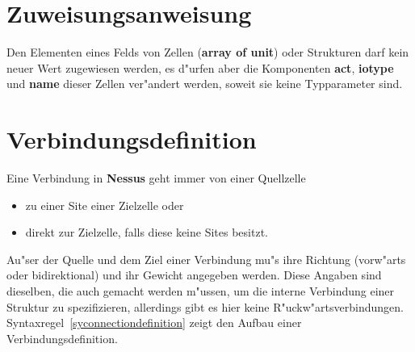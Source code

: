 \section{Zuweisungsanweisung}
\label{assignmentstatement}

\begin{center}
\end{center}

Den Elementen eines Felds von Zellen ({\bf array of unit})
oder Strukturen darf kein neuer Wert zugewiesen werden, es d"urfen
aber die Komponenten {\bf act}, {\bf iotype} und {\bf name} dieser
Zellen ver"andert werden, soweit sie keine Typparameter sind.



\section{Verbindungsdefinition}
\label{Verbindungsdefinition}

Eine Verbindung in {\bf
Nessus} geht immer von einer Quellzelle

\begin{itemize}
  \item zu einer Site einer Zielzelle oder
  \item direkt zur Zielzelle, falls diese keine Sites besitzt.
\end{itemize}

Au"ser der Quelle und dem Ziel einer Verbindung 
 mu"s ihre Richtung (vorw"arts oder
bidirektional) und ihr Gewicht angegeben werden.
Diese Angaben sind dieselben, die auch gemacht werden m"ussen, um die
interne Verbindung einer Struktur zu
spezifizieren, allerdings gibt es hier keine R"uckw"artsverbindungen.
 Syntaxregel~\ref{syconnectiondefinition}
zeigt den Aufbau einer Verbindungsdefinition.

